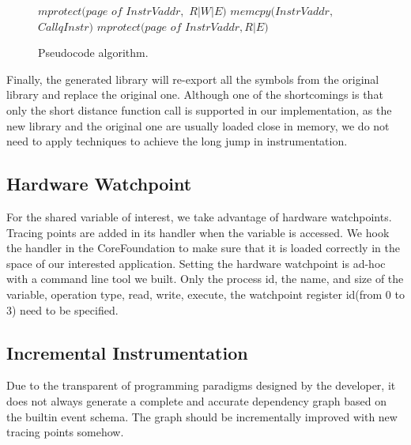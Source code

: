 \begin{figure}
    \begin{algorithmic}[1]
        \State $mprotect(page$ $of$ $InstrVaddr,$ $R|W|E)$
        \State $memcpy(InstrVaddr,$ $CallqInstr)$
        \State $mprotect(page$ $of$ $InstrVaddr, R|E)$
        \EndFor
        \EndProcedure
    \end{algorithmic}
    \label{fig:pseudo-code}
    \caption{Pseudocode algorithm.}
\end{figure}

Finally, the generated library will re-export all the symbols from the original library and replace the original one.
Although one of the shortcomings is that only the short distance function call is supported in our implementation, as the new library and the original one are usually loaded close in memory, we do not need to apply techniques to achieve the long jump in instrumentation.
\subsection{Hardware Watchpoint}
For the shared variable of interest, we take advantage of hardware watchpoints.
Tracing points are added in its handler when the variable is accessed.
We hook the handler in the CoreFoundation to make sure that it is loaded correctly in the space of our interested application.
Setting the hardware watchpoint is ad-hoc with a command line tool we built.
Only the process id, the name, and size of the variable, operation type, read, write, execute, the watchpoint register id(from 0 to 3) need to be specified.

\subsection{Incremental Instrumentation}
Due to the transparent of programming paradigms designed by the developer, it does not always generate a complete and accurate dependency graph based on the builtin event schema.
The graph should be incrementally improved with new tracing points somehow.

